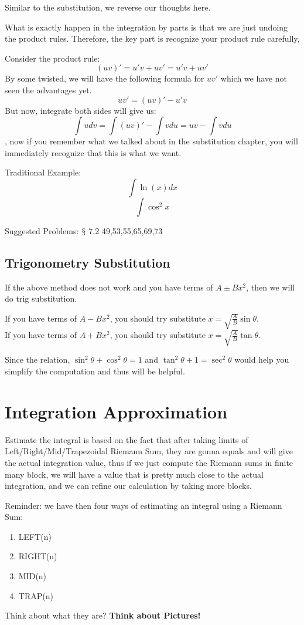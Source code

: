 \documentclass[12pt]{article}
\theoremstyle{definition}
\theoremstyle{definition}
\theoremstyle{remark}
\theoremstyle{definition}
\theoremstyle{definition}
\theoremstyle{definition}
\begin{document}
Similar to the substitution, we reverse our thoughts here.

What is exactly happen in the integration by parts is that we are just undoing the product rules. Therefore, the key part is recognize your product rule carefully, 

Consider the product rule:
\[(uv)'=u'v+uv'=u'v+uv' \]
By some twisted, we will have the following formula for $uv'$ which we have not seen the advantages yet.
\[uv'=(uv)'−u'v\]
But now, integrate both sides will give us:
\[\int udv=\int(uv)′−\int vdu= uv - \int v du\], now if you remember what we talked about in the substitution chapter, you will immediately recognize that this is what we want.

Traditional Example:\[\int \ln(x) dx\] \[\int \cos^2 x\]

Suggested Problems: $\mathsection$ 7.2 49,53,55,65,69,73

\subsection{Trigonometry Substitution}

If the above method does not work and you have terms of $A\pm Bx^{2}$, then we will do trig substitution.

If you have terms of $A-Bx^{2}$, you should try substitute $x=\sqrt{\frac{A}{B}}\sin \theta$.\\
If you have terms of $A+Bx^{2}$, you should try substitute $x=\sqrt{\frac{A}{B}}\tan \theta$.

Since the relation, $\sin^{2}\theta+\cos^{2}\theta=1$ and $\tan^{2}\theta+1=\sec^{2}\theta$ would help you simplify the computation and thus will be helpful.


\section{Integration Approximation}

Estimate the integral is based on the fact that after taking limits of Left/Right/Mid/Trapezoidal Riemann Sum, they are gonna equals and will give the actual integration value, thus if we just compute the Riemann sums in finite many block, we will have a value that is pretty much close to the actual integration, and we can refine our calculation by taking more blocks.

Reminder: we have then four ways of estimating an integral using a Riemann Sum:
\begin{enumerate}
\item LEFT(n)
\item RIGHT(n)
\item MID(n)
\item TRAP(n)
\end{enumerate}
Think about what they are?
\textbf{Think about Pictures!}
\end{document}
